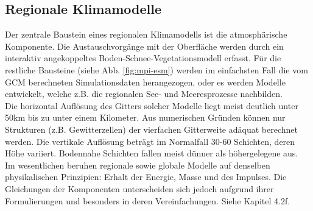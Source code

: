\subsection{Regionale Klimamodelle}
Der zentrale Baustein eines regionalen Klimamodells ist die atmosphärische Komponente. Die Austauschvorgänge mit der Oberfläche werden durch ein interaktiv angekoppeltes Boden-Schnee-Vegetationsmodell erfasst. Für die restliche Bausteine (siehe Abb. \ref{fig:mpi-esm}) werden im einfachsten Fall die vom GCM berechneten Simulationsdaten herangezogen, oder es werden Modelle entwickelt, welche z.B. die regionalen See- und Meeresprozesse nachbilden.\\
Die horizontal Auflösung des Gitters solcher Modelle liegt meist deutlich unter 50km bis zu unter einem Kilometer. Aus numerischen Gründen können nur Strukturen (z.B. Gewitterzellen) der vierfachen Gitterweite adäquat berechnet werden. Die vertikale Auflösung beträgt im Normalfall 30-60 Schichten, deren Höhe variiert. Bodennahe Schichten fallen meist dünner als höhergelegene aus.\\
Im wesentlichen beruhen regionale sowie globale Modelle auf denselben physikalischen Prinzipien: Erhalt der Energie, Masse und des Impulses. Die Gleichungen der Komponenten unterscheiden sich jedoch aufgrund ihrer Formulierungen und besonders in deren Vereinfachungen. Siehe \cite{RCM} Kapitel 4.2f.
